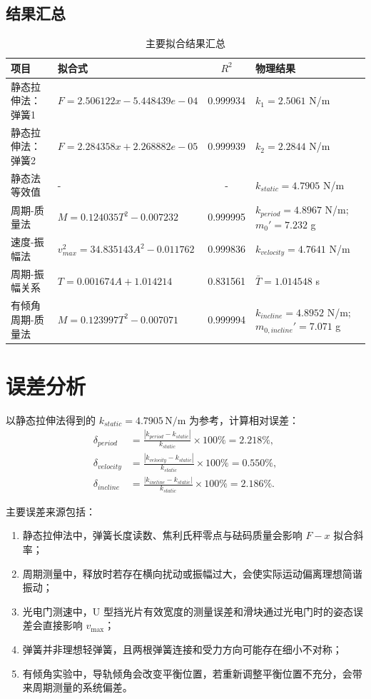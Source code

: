 \documentclass[UTF8,zihao=-4]{ctexart}
\begin{document}
\subsection{结果汇总}
\begin{table}[H]
\centering
\footnotesize
\caption{主要拟合结果汇总}
\label{tab:summary}
\begin{tabular}{p{3.0cm}p{5.2cm}cp{5.0cm}}
\toprule
项目 & 拟合式 & $R^2$ & 物理结果 \\
\midrule
静态拉伸法：弹簧1 & $F=2.506122x-5.448439e-04$ & 0.999934 & $k_1=2.5061$ N/m \\
静态拉伸法：弹簧2 & $F=2.284358x+2.268882e-05$ & 0.999939 & $k_2=2.2844$ N/m \\
静态法等效值 & - & - & $k_{static}=4.7905$ N/m \\
周期-质量法 & $M=0.124035T^2-0.007232$ & 0.999995 & $k_{period}=4.8967$ N/m; $m_0'=7.232$ g \\
速度-振幅法 & $v_{max}^2=34.835143A^2-0.011762$ & 0.999836 & $k_{velocity}=4.7641$ N/m \\
周期-振幅关系 & $T=0.001674A+1.014214$ & 0.831561 & $\bar T=1.014548$ s \\
有倾角周期-质量法 & $M=0.123997T^2-0.007071$ & 0.999994 & $k_{incline}=4.8952$ N/m; $m_{0,incline}'=7.071$ g \\
\bottomrule
\end{tabular}
\end{table}

\section{误差分析}
以静态拉伸法得到的 $k_{static}=4.7905\,\mathrm{N/m}$ 为参考，计算相对误差：
\begin{align}
  \delta_{period}&=\frac{|k_{period}-k_{static}|}{k_{static}}\times100\%=2.218\%,\\
  \delta_{velocity}&=\frac{|k_{velocity}-k_{static}|}{k_{static}}\times100\%=0.550\%,\\
  \delta_{incline}&=\frac{|k_{incline}-k_{static}|}{k_{static}}\times100\%=2.186\%.
\end{align}

主要误差来源包括：
\begin{enumerate}[leftmargin=3em]
  \item 静态拉伸法中，弹簧长度读数、焦利氏秤零点与砝码质量会影响 $F-x$ 拟合斜率；
  \item 周期测量中，释放时若存在横向扰动或振幅过大，会使实际运动偏离理想简谐振动；
  \item 光电门测速中，U 型挡光片有效宽度的测量误差和滑块通过光电门时的姿态误差会直接影响 $v_{\max}$；
  \item 弹簧并非理想轻弹簧，且两根弹簧连接和受力方向可能存在细小不对称；
  \item 有倾角实验中，导轨倾角会改变平衡位置，若重新调整平衡位置不充分，会带来周期测量的系统偏差。
\end{enumerate}
\end{document}
